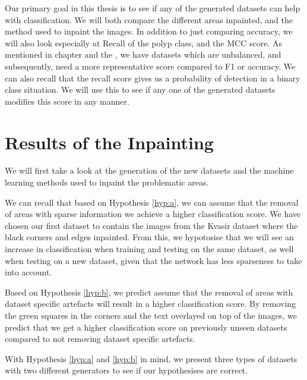 Our primary goal in this thesis is to see if any of the generated datasets can help with classification. We will both compare the different areas inpainted, and the method used to inpaint the images. 
In addition to just comparing accuracy, we will also look especially at Recall of the polyp class, and the MCC score. 
As mentioned in chapter  and the , we have datasets which are unbalanced, and subsequently, need a more representative score compared to F1 or accuracy. 
We can also recall that the recall score  gives us a  probability of detection in a binary class situation. We will use this to see if any one of the generated datasets modifies this score in any manner. 






\section{Results of the Inpainting}
We will first take a look at the generation of the new datasets and the machine learning methods used to inpaint the problematic areas.

We can recall that based on  Hypothesis \ref{hyp:a}, we can assume that the removal of areas with sparse information we achieve a higher classification score. We have chosen our first dataset to contain the images from the Kvasir dataset where the black corners and edges inpainted. 
From this, we hypotosise that we will see an increase in classification when training and testing on the same dataset, as well when testing on a new dataset, given that the network has less sparseness to take into account. 

Based on Hypothesis \ref{hyp:b}, we predict assume that the removal of areas with dataset specific artefacts will result in a higher classification score.  By removing the green squares in the corners and the text overlayed on top of the images, we predict that we get a higher classification score on previously unseen datasets compared to not removing dataset specific artefacts.


With Hypothesis \ref{hyp:a} and \ref{hyp:b} in mind, we present three types of datasets with two different generators to see if our hypothesises are correct.




